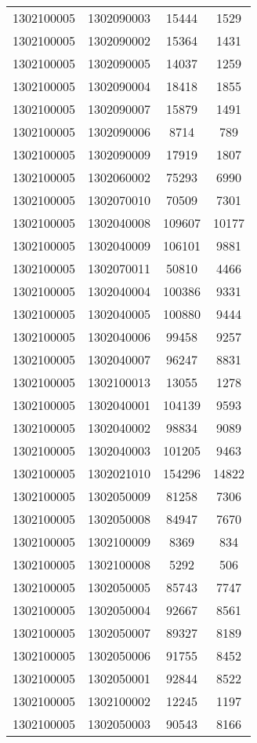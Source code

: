 \begin{longtable}[h]{llcc}
		1302100005 & 1302090003 & 15444 & 1529\\
		1302100005 & 1302090002 & 15364 & 1431\\
		1302100005 & 1302090005 & 14037 & 1259\\
		1302100005 & 1302090004 & 18418 & 1855\\
		1302100005 & 1302090007 & 15879 & 1491\\
		1302100005 & 1302090006 & 8714 & 789\\
		1302100005 & 1302090009 & 17919 & 1807\\
		1302100005 & 1302060002 & 75293 & 6990\\
		1302100005 & 1302070010 & 70509 & 7301\\
		1302100005 & 1302040008 & 109607 & 10177\\
		1302100005 & 1302040009 & 106101 & 9881\\
		1302100005 & 1302070011 & 50810 & 4466\\
		1302100005 & 1302040004 & 100386 & 9331\\
		1302100005 & 1302040005 & 100880 & 9444\\
		1302100005 & 1302040006 & 99458 & 9257\\
		1302100005 & 1302040007 & 96247 & 8831\\
		1302100005 & 1302100013 & 13055 & 1278\\
		1302100005 & 1302040001 & 104139 & 9593\\
		1302100005 & 1302040002 & 98834 & 9089\\
		1302100005 & 1302040003 & 101205 & 9463\\
		1302100005 & 1302021010 & 154296 & 14822\\
		1302100005 & 1302050009 & 81258 & 7306\\
		1302100005 & 1302050008 & 84947 & 7670\\
		1302100005 & 1302100009 & 8369 & 834\\
		1302100005 & 1302100008 & 5292 & 506\\
		1302100005 & 1302050005 & 85743 & 7747\\
		1302100005 & 1302050004 & 92667 & 8561\\
		1302100005 & 1302050007 & 89327 & 8189\\
		1302100005 & 1302050006 & 91755 & 8452\\
		1302100005 & 1302050001 & 92844 & 8522\\
		1302100005 & 1302100002 & 12245 & 1197\\
		1302100005 & 1302050003 & 90543 & 8166\\

\end{longtable}
